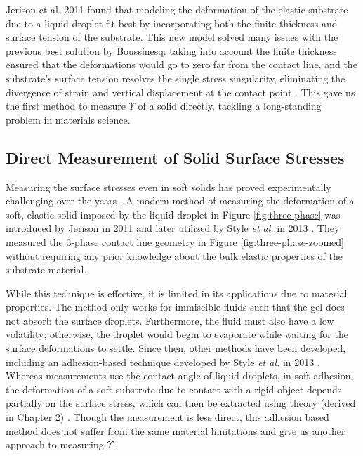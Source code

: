 Jerison et al. 2011 \cite{jerison2011deformation} found that modeling the deformation of the elastic substrate due to a liquid droplet fit best by incorporating both the finite thickness and surface tension of the substrate. This new model solved many issues with the previous best solution by Boussinesq: taking into account the finite thickness ensured that the deformations would go to zero far from the contact line, and the substrate's surface tension resolves the single stress singularity, eliminating the divergence of strain and vertical displacement at the contact point \cite{liang2018surface}. This gave us the first method to measure $ \Upsilon $ of a solid directly, tackling a long-standing problem in materials science.


\subsection{Direct Measurement of Solid Surface Stresses}
Measuring the surface stresses even in soft solids has proved experimentally challenging over the years \cite{xu2016surface,jensen2015wetting,mondal2015estimation,style2013surface,jagota2012surface,nadermann2013solid,park2014visualization}. A modern method of measuring the deformation of a soft, elastic solid imposed by the liquid droplet in Figure \ref{fig:three-phase} was introduced by Jerison in 2011 \cite{jerison2011deformation} and later utilized by Style \emph{et al.} in 2013 \cite{style2013universal}. They measured the 3-phase contact line geometry in Figure \ref{fig:three-phase-zoomed} without requiring any prior knowledge about the bulk elastic properties of the substrate material. 

While this technique is effective, it is limited in its applications due to material properties. The method only works for immiscible fluids such that the gel does not absorb the surface droplets. Furthermore, the fluid must also have a low volatility; otherwise, the droplet would begin to evaporate while waiting for the surface deformations to settle. Since then, other methods have been developed, including an adhesion-based technique developed by Style \textit{et al.} in 2013 \cite{style2013surface}. Whereas measurements use the contact angle of liquid droplets, in soft adhesion, the deformation of a soft substrate due to contact with a rigid object depends partially on the surface stress, which can then be extracted using theory (derived in Chapter 2) \cite{tian2018measure,CaoZhen2014EAaW,caoAdhesion}. Though the measurement is less direct, this adhesion based method does not suffer from the same material limitations and give us another approach to measuring $ \Upsilon $.  



